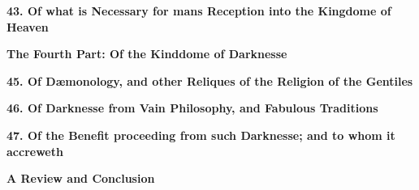 \documentclass[11pt]{article}
\newcommand{\sectiontitle}[1]{{\Large {\bfseries #1}}}
\newcommand{\chapter}[1]{{\bfseries #1}}
\begin{document}
\chapter{43. Of what is Necessary for mans Reception into the Kingdome
of Heaven}

\sectiontitle{The Fourth Part: Of the Kinddome of Darknesse} 

\chapter{45. Of D\ae monology, and other Reliques of the 
Religion of the Gentiles}

\chapter{46. Of Darknesse from Vain Philosophy, and Fabulous Traditions}

\chapter{47. Of the Benefit proceeding from such Darknesse; and
to whom it accreweth}

\sectiontitle{A Review and Conclusion}
\end{document}
